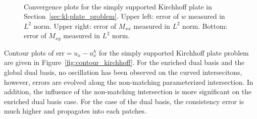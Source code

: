 \begin{figure}[ht]
	\center
	\captionsetup[subfigure]{labelformat=empty}
	\begin{subfigure}{.45\linewidth}
		\center
		
	\end{subfigure}\hspace{2mm}
	\begin{subfigure}{.45\linewidth}
		\center
		
	\end{subfigure}\\
	\begin{subfigure}{.45\linewidth}
		\center
		
	\end{subfigure}
	\caption{Convergence plots for the simply supported Kirchhoff plate in Section~\ref{sec:kl-plate_problem}. Upper left: error of $w$ measured in $L^2$ norm. Upper right: error of $M_{xx}$ measured in $L^2$ norm. Bottom: error of $M_{xy}$ measured in $L^2$ norm.}\label{fig:convergence_kirchhoff}
\end{figure}

Contour plots of $\text{err}=u_x-u_x^h$ for the simply supported Kirchhoff plate problem are given in Figure~\ref{fig:contour_kirchhoff}. For the enriched dual basis and the global dual basis, no oscillation has been observed on the curved intersecitons, however, errors are evolved along the non-matching parameterized intersection. In addition, the influence of the non-matching intersection is more significant on the enriched dual basis case. For the case of the \Bezier dual basis, the consistency error is much higher and propagates into each patches.

